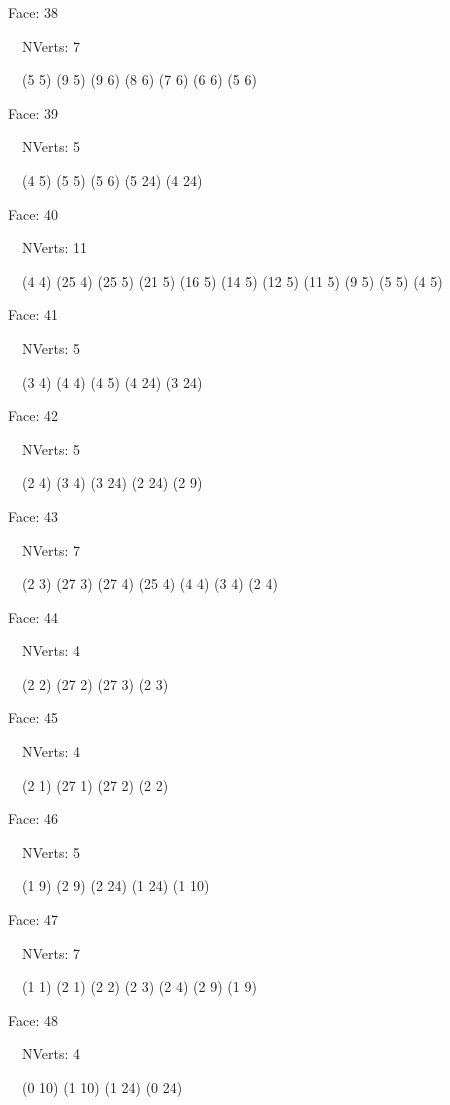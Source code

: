 \documentclass{article}
\begin{document}
{\footnotesize 

Face: 38

\   \    NVerts: 7

 \   \   (5 5) (9 5) (9 6) (8 6) (7 6) (6 6) (5 6)}

{\footnotesize 

Face: 39

\   \    NVerts: 5

 \   \   (4 5) (5 5) (5 6) (5 24) (4 24)}

{\footnotesize 

Face: 40

\   \    NVerts: 11

 \   \   (4 4) (25 4) (25 5) (21 5) (16 5) (14 5) (12 5) (11 5) (9 5) (5 5) (4 5)}

{\footnotesize 

Face: 41

\   \    NVerts: 5

 \   \   (3 4) (4 4) (4 5) (4 24) (3 24)}

{\footnotesize 

Face: 42

\   \    NVerts: 5

 \   \   (2 4) (3 4) (3 24) (2 24) (2 9)}

{\footnotesize 

Face: 43

\   \    NVerts: 7

 \   \   (2 3) (27 3) (27 4) (25 4) (4 4) (3 4) (2 4)}

{\footnotesize 

Face: 44

\   \    NVerts: 4

 \   \   (2 2) (27 2) (27 3) (2 3)}

{\footnotesize 

Face: 45

\   \    NVerts: 4

 \   \   (2 1) (27 1) (27 2) (2 2)}

{\footnotesize 

Face: 46

\   \    NVerts: 5

 \   \   (1 9) (2 9) (2 24) (1 24) (1 10)}

{\footnotesize 

Face: 47

\   \    NVerts: 7

 \   \   (1 1) (2 1) (2 2) (2 3) (2 4) (2 9) (1 9)}

{\footnotesize 

Face: 48

\   \    NVerts: 4

 \   \   (0 10) (1 10) (1 24) (0 24)}
\end{document}
